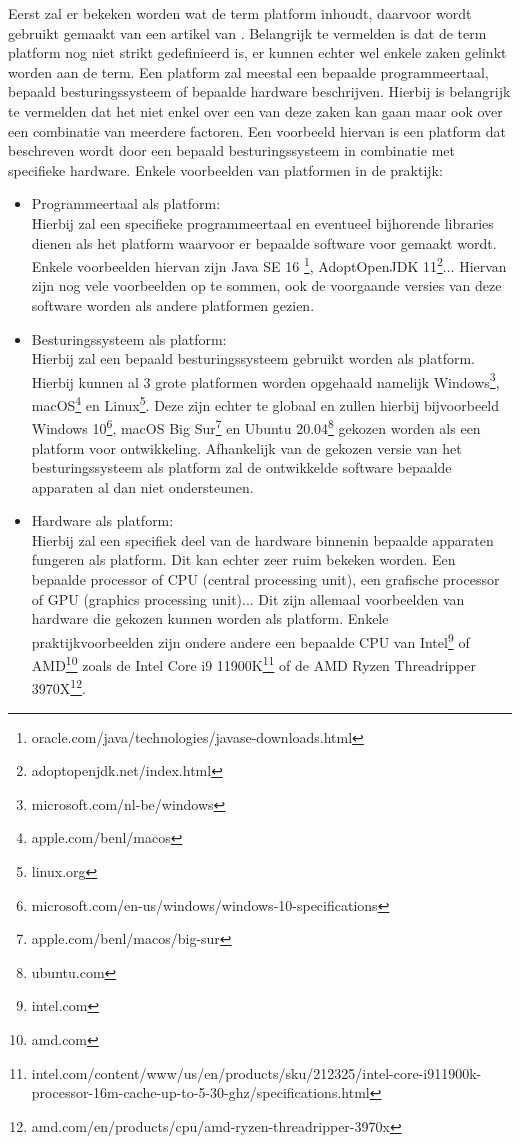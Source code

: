 Eerst zal er bekeken worden wat de term platform inhoudt, daarvoor wordt gebruikt gemaakt van een artikel van \textcite{Bishop2006}. Belangrijk te vermelden is dat de term platform nog niet strikt gedefinieerd is, er kunnen echter wel enkele zaken gelinkt worden aan de term. Een platform zal meestal een bepaalde programmeertaal, bepaald besturingssysteem of bepaalde hardware beschrijven. Hierbij is belangrijk te vermelden dat het niet enkel over een van deze zaken kan gaan maar ook over een combinatie van meerdere factoren. Een voorbeeld hiervan is een platform dat beschreven wordt door een bepaald besturingssysteem in combinatie met specifieke hardware. Enkele voorbeelden van platformen in de praktijk:
\begin{itemize}
\item Programmeertaal als platform:\\
Hierbij zal een specifieke programmeertaal en eventueel bijhorende libraries dienen als het platform waarvoor er bepaalde software voor gemaakt wordt. Enkele voorbeelden hiervan zijn Java SE 16 \footnote{oracle.com/java/technologies/javase-downloads.html}, AdoptOpenJDK 11\footnote{adoptopenjdk.net/index.html}... Hiervan zijn nog vele voorbeelden op te sommen, ook de voorgaande versies van deze software worden als andere platformen gezien.
\\

\item Besturingssysteem als platform:\\
Hierbij zal een bepaald besturingssysteem gebruikt worden als platform. Hierbij kunnen al 3 grote platformen worden opgehaald namelijk Windows\footnote{microsoft.com/nl-be/windows}, macOS\footnote{apple.com/benl/macos} en Linux\footnote{linux.org}. Deze zijn echter te globaal en zullen hierbij bijvoorbeeld Windows 10\footnote{microsoft.com/en-us/windows/windows-10-specifications}, macOS Big Sur\footnote{apple.com/benl/macos/big-sur} en Ubuntu 20.04\footnote{ubuntu.com} gekozen worden als een platform voor ontwikkeling. Afhankelijk van de gekozen versie van het besturingssysteem als platform zal de ontwikkelde software bepaalde apparaten al dan niet ondersteunen.
\\

\item Hardware als platform:\\
Hierbij zal een specifiek deel van de hardware binnenin bepaalde apparaten fungeren als platform. Dit kan echter zeer ruim bekeken worden. Een bepaalde processor of CPU (central processing unit), een grafische processor of GPU (graphics processing unit)... Dit zijn allemaal voorbeelden van hardware die gekozen kunnen worden als platform. Enkele praktijkvoorbeelden zijn ondere andere een bepaalde CPU van Intel\footnote{intel.com} of AMD\footnote{amd.com} zoals de Intel Core i9 11900K\footnote{intel.com/content/www/us/en/products/sku/212325/intel-core-i911900k-processor-16m-cache-up-to-5-30-ghz/specifications.html} of de AMD Ryzen Threadripper 3970X\footnote{amd.com/en/products/cpu/amd-ryzen-threadripper-3970x}.
\\


\end{itemize}
